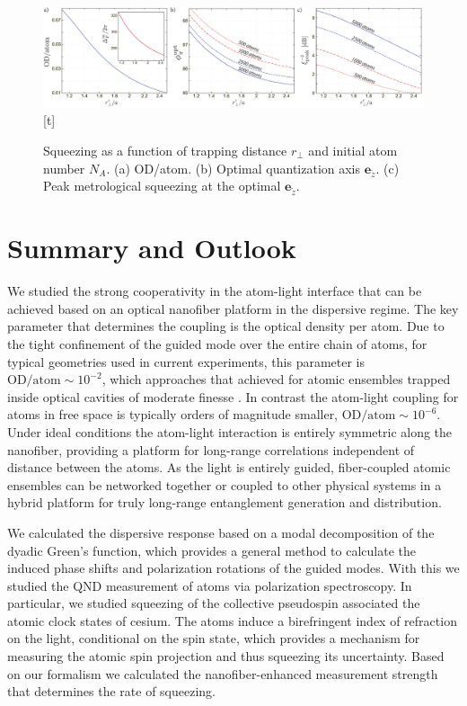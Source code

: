 \documentclass[preprint, aps,pra,onecolumn]{revtex4-1} %
\newcommand{\qaxis}{\mathbf{e}_{\tilde{z}}}
\begin{document}
\begin{figure}\includegraphics[scale=0.4]{./Figs/Fig_SqueezingDistance}[t]
\caption{Squeezing as a function of trapping distance $r_\perp$ and initial atom number $N_A$. (a) OD/atom. (b) Optimal quantization axis $\qaxis$. 
(c) Peak metrological squeezing at the optimal $\qaxis$.} \label{Fig::Squeezing_Distance}
\end{figure}


\section{Summary and Outlook} \label{Sec::Conclusion}

We studied the strong cooperativity in the atom-light interface that can be achieved based on an optical nanofiber platform in the dispersive regime.  
The key parameter that determines the coupling is the optical density per atom.  
Due to the tight confinement of the guided mode over the entire chain of atoms, for typical geometries used in current experiments, this parameter is $ \mathrm{OD}/\mathrm{atom}\sim 10^{-2} $, which approaches that achieved for atomic ensembles trapped inside optical cavities of moderate finesse \cite{chen_conditional_2011, zhang_collective_2012}.  
In contrast the atom-light coupling for atoms in free space is typically orders of magnitude smaller, $ \mathrm{OD}/\mathrm{atom} \sim 10^{-6}$.  
Under ideal conditions the atom-light interaction is entirely symmetric along the nanofiber, providing a platform for long-range correlations independent of distance between the atoms. 
As the light is entirely guided, fiber-coupled atomic ensembles can be networked together or coupled to other physical systems in a hybrid platform \cite{hafezi_atomic_2012, liebermeister_tapered_2014} for truly long-range entanglement generation and distribution. 

We calculated the dispersive response based on a modal decomposition of the dyadic Green's function, which provides a general method to calculate the induced phase shifts and polarization rotations of the guided modes. 
With this we studied the QND measurement of atoms via polarization spectroscopy. 
In particular, we studied squeezing of the collective pseudospin associated the atomic clock states of cesium. 
The atoms induce a birefringent index of refraction on the light, conditional on the spin state, which provides a mechanism for measuring the atomic spin projection and thus squeezing its uncertainty.  
Based on our formalism we calculated the nanofiber-enhanced measurement strength that determines the rate of squeezing.  
\end{document}
